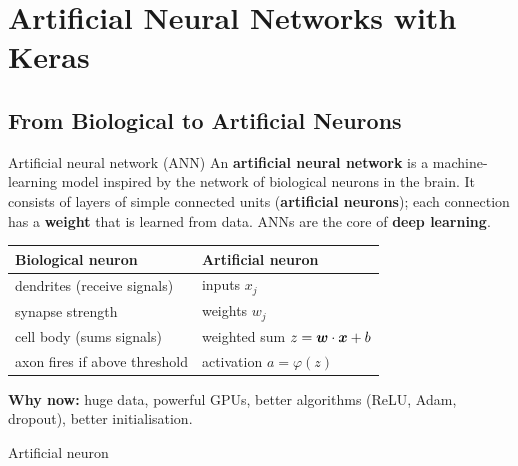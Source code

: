 \chapter{Artificial Neural Networks with Keras}\label{n:ann}

\section{From Biological to Artificial Neurons}
\begin{dfn}{Artificial neural network (ANN)}
An \textbf{artificial neural network} is a machine-learning model inspired by the network of biological neurons in the brain. It consists of layers of simple connected units (\textbf{artificial neurons}); each connection has a \textbf{weight} that is learned from data. ANNs are the core of \textbf{deep learning}.
\end{dfn}
\begin{center}
\small
\begin{tabular}{@{}ll@{}}
\toprule
\textbf{Biological neuron} & \textbf{Artificial neuron}\\
\midrule
dendrites (receive signals) & inputs $x_j$\\
synapse strength & weights $w_j$\\
cell body (sums signals) & weighted sum $z=\boldsymbol{w}\cdot\boldsymbol{x}+b$\\
axon fires if above threshold & activation $a=\varphi(z)$\\
\bottomrule
\end{tabular}
\end{center}
\textbf{Why now:} huge data, powerful GPUs, better algorithms (ReLU, Adam, dropout), better initialisation.

\begin{drawit}{Artificial neuron}
\centering
{}
\end{drawit}

